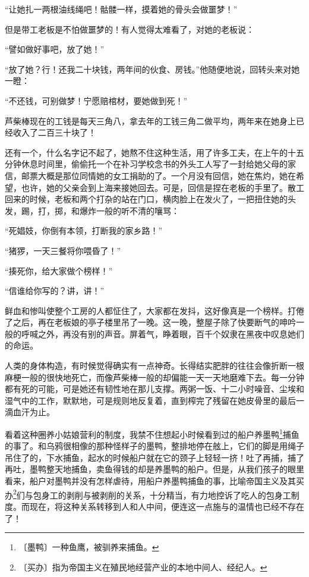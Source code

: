 \documentclass[12pt,UTF-8,openany]{ctexbook}
\begin{document}
\begin{large}
    “让她扎一两根油线绳吧！骷髅一样，摸着她的骨头会做噩梦！”
    
    但是带工老板是不怕做噩梦的！有人觉得太难看了，对她的老板说：
    
    “譬如做好事吧，放了她！”
    
    “放了她？行！还我二十块钱，两年间的伙食、房钱。”他随便地说，回转头来对她一瞪：
    
    “不还钱，可别做梦！宁愿赔棺材，要她做到死！”
    
    芦柴棒现在的工钱是每天三角八，拿去年的工钱三角二做平均，两年来在她身上已经收入了二百三十块了！
    
    还有一个，什么名字记不起了，她熬不住这种生活，用了许多工夫，在上午的十五分钟休息时间里，偷偷托一个在补习学校念书的外头工人写了一封给她父母的家信，邮票大概是那位同情她的女工捐助的了。一个月没有回信，她在焦灼，她在希望，也许，她的父亲会到上海来接她回去。可是，回信是捏在老板的手里了。散工回来的时候，老板和两个打杂的站在门口，横肉脸上在发火了，一把扭住她的头发，踢，打，掷，和爆炸一般的听不清的嚷骂：
    
    “死娼妓，你倒有本领，打断我的家乡路！”
    
    “猪猡，一天三餐将你喂昏了！”
    
    “揍死你，给大家做个榜样！”
    
    “信谁给你写的？讲，讲！”
    
    鲜血和惨叫使整个工房的人都怔住了，大家都在发抖，这好像真是一个榜样。打倦了之后，再在老板娘的亭子楼里吊了一晚。这一晚，整屋子除了快要断气的呻吟一般的呼喊之外，再没有别的声音。屏着气，睁着眼，百千个奴隶在黑夜中叹息她们的命运。
    
    人类的身体构造，有时候觉得确实有一点神奇。长得结实肥胖的往往会像折断一根麻梗一般的很快地死亡，而像芦柴棒一般的却偏能一天一天地磨难下去。每一分钟都有死的可能，可是她还有韧性地在那儿支撑。两粥一饭、十二小时噪音、尘埃和湿气中的工作，默默地，可是规则地反复着，直到榨完了残留在她皮骨里的最后一滴血汗为止。
    
    看着这种圈养小姑娘营利的制度，我禁不住想起小时候看到过的船户养墨鸭\footnote{〔墨鸭〕一种鱼鹰，被驯养来捕鱼。}捕鱼的事了。和乌鸦很相像的那种怪样子的墨鸭，整排地停在舷上，它们的脚是用绳子吊住了的，下水捕鱼，起水的时候船户就在它的颈子上轻轻一挤！吐了再捕，捕了再吐，墨鸭整天地捕鱼，卖鱼得钱的却是养墨鸭的船户。但是，从我们孩子的眼里看来，船户对墨鸭并没有怎样虐待，用船户养墨鸭捕鱼的事，比喻帝国主义及其买办\footnote{〔买办〕指为帝国主义在殖民地经营产业的本地中间人、经纪人。}们与包身工的剥削与被剥削的关系，十分精当，有力地控诉了吃人的包身工制度。而现在，将这种关系转移到人和人中间，便连这一点施与的温情也已经不存在了！
    

\end{large}
\end{document}
